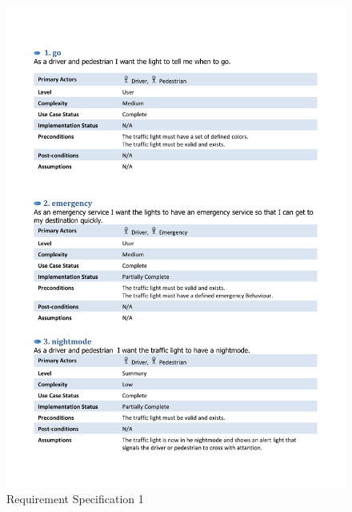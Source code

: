 \documentclass[a4paper]{report}
\begin{document}
\begin{figure}
    \includegraphics[scale=0.75]{p2}
    \caption{Requirement Specification 1}
    \label{fig:requSpec1}
\end{figure}
\end{document}
